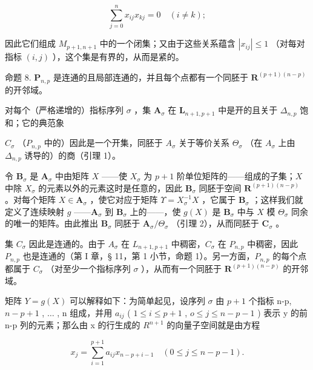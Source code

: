 \[
\sum_ {j = 0} ^ {n} x _ {i j} x _ {k j} = 0 \quad (i \neq k);
\]

因此它们组成 \(M_{p+1, n+1}\) 中的一个闭集；又由于这些关系蕴含 \(|x_{ij}| \leqslant 1\) （对每对指标 \((i, j)\) ），这个集是有界的，从而是紧的。

命题 8. \(\mathbf{P}_{n,p}\) 是连通的且局部连通的，并且每个点都有一个同胚于 \(\mathbf{R}^{(p+1)(n-p)}\) 的开邻域。

对每个（严格递增的）指标序列 \(\sigma\) ，集 \(\mathbf{A}_{\sigma}\) 在 \(\mathbf{L}_{n+1, p+1}\) 中是开的且关于 \(\Delta_{n,p}\) 饱和；它的典范象

\(C_{\sigma}\) （\(P_{n,p}\) 中的）因此是一个开集，同胚于 \(A_{\sigma}\) 关于等价关系 \(\Theta_{\sigma}\) （在 \(A_{\sigma}\) 上由 \(\Delta_{n,p}\) 诱导的）的商（引理 1）。

令 \(\mathbf{B}_{\sigma}\) 是 \(\mathbf{A}_{\sigma}\) 中由矩阵 \(X\) ——使 \(X_{\sigma}\) 为 \(p + 1\) 阶单位矩阵的——组成的子集；\(X\) 中除 \(X_{\sigma}\) 的元素以外的元素这时是任意的，因此 \(\mathbf{B}_{\sigma}\) 同胚于空间 \(\mathbf{R}^{(p + 1)(n - p)}\) 。对每个矩阵 \(X \in \mathbf{A}_{\sigma}\) ，使它对应于矩阵 \(\Upsilon = X_{\sigma}^{-1}X\) ，它属于 \(\mathbf{B}_{\sigma}\) ；这样我们就定义了连续映射 \(g\) ——\(\mathbf{A}_{\sigma}\) 到 \(\mathbf{B}_{\sigma}\) 上的——，使 \(g(X)\) 是 \(\mathbf{B}_{\sigma}\) 中与 \(X\) 模 \(\Theta_{\sigma}\) 同余的唯一的矩阵。由此推出 \(\mathbf{B}_{\sigma}\) 同胚于 \(\mathbf{A}_{\sigma}/\Theta_{\sigma}\) （引理 2），从而同胚于 \(\mathbf{C}_{\sigma}\) 。

集 \(C_{\sigma}\) 因此是连通的。由于 \(A_{\sigma}\) 在 \(L_{n+1, p+1}\) 中稠密，\(C_{\sigma}\) 在 \(P_{n, p}\) 中稠密，因此 \(P_{n, p}\) 也是连通的（第 I 章，§ 11，第 1 小节，命题 1）。另一方面，\(P_{n, p}\) 的每个点都属于 \(C_{\sigma}\) （对至少一个指标序列 \(\sigma\) ），从而有一个同胚于 \(\mathbf{R}^{(p+1)(n-p)}\) 的开邻域。

矩阵 \(Y=g(X)\) 可以解释如下：为简单起见，设序列 \(\sigma\) 由 \(p+1\) 个指标 n-p, \(n-p+1\) , \(\ldots\) , n 组成，并用 \(a_{ij}\) ( \(1\leqslant i\leqslant p+1\) , \(o\leqslant j\leqslant n-p-1\) ) 表示 y 的前 n-p 列的元素；那么由 x 的行生成的 \(R^{n+1}\) 的向量子空间就是由方程

\[
x _ {j} = \sum_ {i = 1} ^ {p + 1} a _ {i j} x _ {n - p + i - 1} \quad (0 \leqslant j \leqslant n - p - 1).
\]

